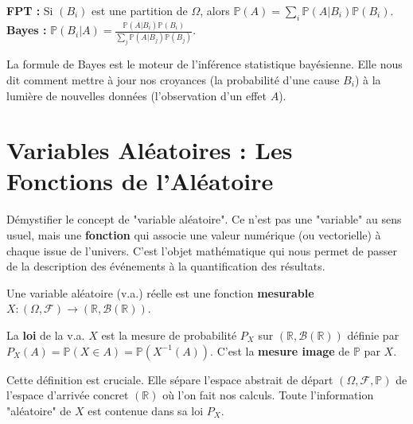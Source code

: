 \begin{theorem}
    \textbf{FPT :} Si $(B_i)$ est une partition de $\Omega$, alors $\mathbb{P}(A) = \sum_i \mathbb{P}(A|B_i)\mathbb{P}(B_i)$.
    \textbf{Bayes :} $\mathbb{P}(B_i|A) = \frac{\mathbb{P}(A|B_i)\mathbb{P}(B_i)}{\sum_j \mathbb{P}(A|B_j)\mathbb{P}(B_j)}$.
\end{theorem}
\begin{remark}
    La formule de Bayes est le moteur de l'inférence statistique bayésienne. Elle nous dit comment mettre à jour nos croyances (la probabilité d'une cause $B_i$) à la lumière de nouvelles données (l'observation d'un effet $A$).
\end{remark}

\section{Variables Aléatoires : Les Fonctions de l'Aléatoire}

\begin{objectif}
    Démystifier le concept de "variable aléatoire". Ce n'est pas une "variable" au sens usuel, mais une \textbf{fonction} qui associe une valeur numérique (ou vectorielle) à chaque issue de l'univers. C'est l'objet mathématique qui nous permet de passer de la description des événements à la quantification des résultats.
\end{objectif}

\begin{definition}
    Une variable aléatoire (v.a.) réelle est une fonction \textbf{mesurable} $X: (\Omega, \mathcal{F}) \to (\mathbb{R}, \mathcal{B}(\mathbb{R}))$.
\end{definition}

\begin{definition}
    La \textbf{loi} de la v.a. $X$ est la mesure de probabilité $P_X$ sur $(\mathbb{R}, \mathcal{B}(\mathbb{R}))$ définie par $P_X(A) = \mathbb{P}(X \in A) = \mathbb{P}(X^{-1}(A))$.
    C'est la \textbf{mesure image} de $\mathbb{P}$ par $X$.
\end{definition}
\begin{remark}
    Cette définition est cruciale. Elle sépare l'espace abstrait de départ $(\Omega, \mathcal{F}, \mathbb{P})$ de l'espace d'arrivée concret $(\mathbb{R})$ où l'on fait nos calculs. Toute l'information "aléatoire" de $X$ est contenue dans sa loi $P_X$.
\end{remark}

